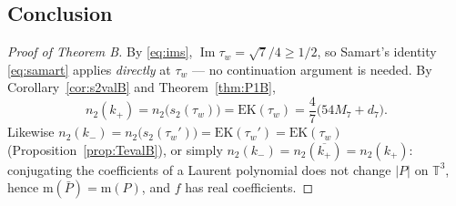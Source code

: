 \documentclass[11pt]{article}
\theoremstyle{definition}
\theoremstyle{remark}
\newcommand{\Tt}{\mathbb{T}}
\newcommand{\ImT}{\operatorname{Im}}
\newcommand{\m}{\mathrm{m}}
\begin{document}
\subsection{Conclusion}

\begin{proof}[Proof of Theorem B]
By \eqref{eq:ims}, $\ImT\tau_w=\sqrt7/4\ge1/2$, so Samart's identity
\eqref{eq:samart} applies \emph{directly} at $\tau_w$ --- no continuation
argument is needed. By Corollary~\ref{cor:s2valB} and
Theorem~\ref{thm:P1B},
\[
  n_2(k_+)=n_2\bigl(s_2(\tau_w)\bigr)=\mathrm{EK}(\tau_w)
  =\frac47\bigl(54M_7+d_7\bigr).
\]
Likewise $n_2(k_-)=n_2\bigl(s_2(\tau_w')\bigr)=\mathrm{EK}(\tau_w')
=\mathrm{EK}(\tau_w)$ (Proposition~\ref{prop:TevalB}), or simply
$n_2(k_-)=n_2(\overline{k_+})=n_2(k_+)$: conjugating the coefficients
of a Laurent polynomial does not change $|P|$ on $\Tt^3$, hence
$\m(\bar P)=\m(P)$, and $f$ has real coefficients.
\end{proof}
\end{document}
